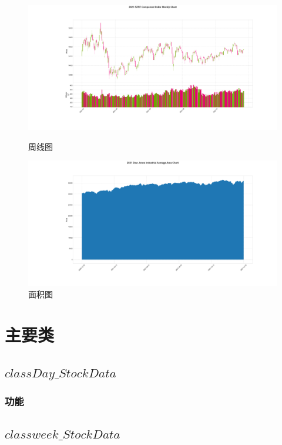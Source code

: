 \documentclass{ctexart}
\begin{document}
\begin{figure}[htbp]
	\centering
	\begin{minipage}{0.49\linewidth}
		\centering
		\includegraphics[width=0.9\linewidth]{weekly_chart.png}
		\caption{周线图}
		\label{周线图}%
	\end{minipage}
	\begin{minipage}{0.49\linewidth}
		\centering
		\includegraphics[width=0.9\linewidth]{area_chart.png}
		\caption{面积图}
	\end{minipage}
\end{figure}

\section{主要类}
\subsection{$class Day\_StockData$}

\subsubsection{功能}

\subsection{$class week\_StockData$}
\end{document}
